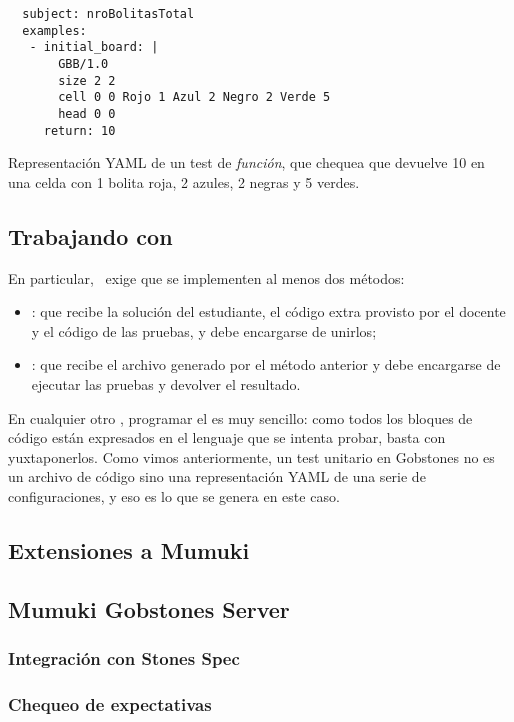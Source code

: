 \begin{listing}
  \centering

  \begin{verbatim}
  subject: nroBolitasTotal
  examples:
   - initial_board: |
       GBB/1.0
       size 2 2
       cell 0 0 Rojo 1 Azul 2 Negro 2 Verde 5
       head 0 0
     return: 10
  \end{verbatim}

  \caption{Representación YAML de un test de \emph{función}, que chequea que  devuelve 10 en una celda con 1 bolita roja, 2 azules, 2 negras y 5 verdes.}
  \label{lst:FunctionSpec}
\end{listing}


\subsection{Trabajando con \mumukit}
En particular, \mumukit\ exige que se implementen al menos dos métodos:
\begin{itemize}
  \item{: que recibe la solución del estudiante, el código extra provisto por el docente y el código de las pruebas, y debe encargarse de unirlos;}
  \item{: que recibe el archivo generado por el método anterior y debe encargarse de ejecutar las pruebas y devolver el resultado.}
\end{itemize}

En cualquier otro \runner, programar el  es muy sencillo: como todos los bloques de código están expresados en el lenguaje que se intenta probar, basta con yuxtaponerlos. Como vimos anteriormente, un test unitario en Gobstones no es un archivo de código sino una representación YAML de una serie de configuraciones, y eso es lo que se genera en este caso.

\subsection{Extensiones a Mumuki}

\subsection{Mumuki Gobstones Server}
\subsubsection{Integración con Stones Spec}
\subsubsection{Chequeo de expectativas}
